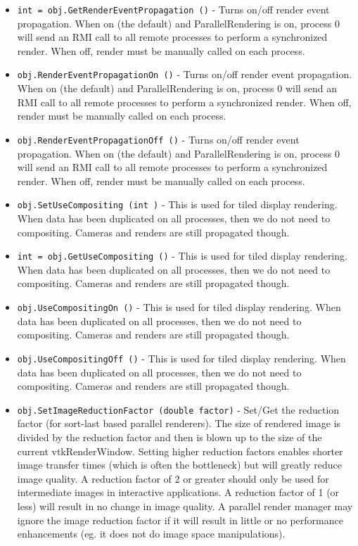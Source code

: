 \begin{itemize}
\item  \verb|int = obj.GetRenderEventPropagation ()| -  Turns on/off render event propagation.  When on (the default) and
 ParallelRendering is on, process 0 will send an RMI call to all remote
 processes to perform a synchronized render.  When off, render must be
 manually called on each process.

\item  \verb|obj.RenderEventPropagationOn ()| -  Turns on/off render event propagation.  When on (the default) and
 ParallelRendering is on, process 0 will send an RMI call to all remote
 processes to perform a synchronized render.  When off, render must be
 manually called on each process.

\item  \verb|obj.RenderEventPropagationOff ()| -  Turns on/off render event propagation.  When on (the default) and
 ParallelRendering is on, process 0 will send an RMI call to all remote
 processes to perform a synchronized render.  When off, render must be
 manually called on each process.

\item  \verb|obj.SetUseCompositing (int )| -  This is used for tiled display rendering.  When data has been
 duplicated on all processes, then we do not need to compositing.
 Cameras and renders are still propagated though.

\item  \verb|int = obj.GetUseCompositing ()| -  This is used for tiled display rendering.  When data has been
 duplicated on all processes, then we do not need to compositing.
 Cameras and renders are still propagated though.

\item  \verb|obj.UseCompositingOn ()| -  This is used for tiled display rendering.  When data has been
 duplicated on all processes, then we do not need to compositing.
 Cameras and renders are still propagated though.

\item  \verb|obj.UseCompositingOff ()| -  This is used for tiled display rendering.  When data has been
 duplicated on all processes, then we do not need to compositing.
 Cameras and renders are still propagated though.

\item  \verb|obj.SetImageReductionFactor (double factor)| -  Set/Get the reduction factor (for sort-last based parallel renderers).
 The size of rendered image is divided by the reduction factor and then
 is blown up to the size of the current vtkRenderWindow.  Setting
 higher reduction factors enables shorter image transfer times (which
 is often the bottleneck) but will greatly reduce image quality.  A
 reduction factor of 2 or greater should only be used for intermediate
 images in interactive applications.  A reduction factor of 1 (or less)
 will result in no change in image quality.  A parallel render manager
 may ignore the image reduction factor if it will result in little or
 no performance enhancements (eg. it does not do image space
 manipulations).


\end{itemize}
